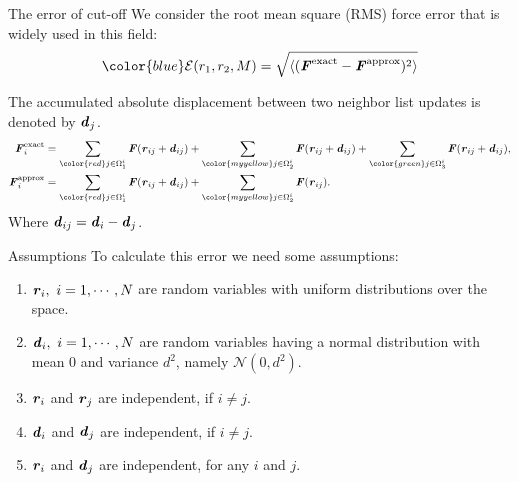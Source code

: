 \documentclass{beamer}
\newcommand{\redc}[1]{{\color{red} #1}}
\newcommand{\bluec}[1]{{\color{blue} #1}}
\newcommand{\yellowc}[1]{{\color{myyellow} #1}}
\newcommand{\greenc}[1]{{\color{green} #1}}
\renewcommand{\v}[1]{\textbf{\textit{#1}}}
\begin{document}
\begin{frame}{The error of cut-off}
  We consider the root mean square (RMS) force error that is widely
  used in this field:
  \begin{align*}
   \bluec{\mathcal E(r_1, r_2, M) =
    \sqrt{\langle(\v F^{\textrm{exact}} - \v
      F^{\textrm{{approx}}})^2\rangle} }    
  \end{align*}

  The accumulated absolute displacement between two
  neighbor list updates is denoted by {$\v d_j$}.  \bluec{
  \begin{align*}
    \v F_i^{\textrm{exact}} & =
    \sum_{\redc{j\in\Omega_1^i}}\v F(\v r_{ij} + \v d_{ij}) +
    \sum_{\yellowc{j\in\Omega_2^i}}\v F(\v r_{ij} + \v d_{ij}) +
    \sum_{\greenc{j\in\Omega_3^i}}\v F(\v r_{ij} + \v d_{ij}),\\
    \v F_i^{\textrm{approx}} & =
    \sum_{\redc{j\in\Omega_1^i}}\v F(\v r_{ij} + \v d_{ij}) +
    \sum_{\yellowc{j\in\Omega_2^i}}\v F(\v r_{ij}).
  \end{align*}
  }
  Where {$\v d_{ij} = \v d_i - \v d_j$}.
\end{frame}

\begin{frame}[label=short-assumptions]{Assumptions}
  \vfill
  To
  calculate this error we need some assumptions:
  \begin{enumerate}
  \vfill
  \item $\v r_i,\ i=1,\cdots,N$ are random variables with \redc{uniform
    distributions} over the space.
  \item $\v d_i,\ i=1,\cdots,N$ are random variables having a \redc{normal
    distribution} with mean 0 and variance $d^2$, namely
    $\mathcal{N}(0, d^2)$.
  \item $\v r_i$ and $\v r_j$ are \redc{independent}, if $i\neq j$.
  \item $\v d_i$ and $\v d_j$ are \redc{independent}, if $i\neq j$.
  \item $\v r_i$ and $\v d_j$ are \redc{independent}, for any $i$ and $j$.
  \end{enumerate}
  \vfill
  \hfill\hyperlink{short-result-1}{}
\end{frame}
\end{document}
